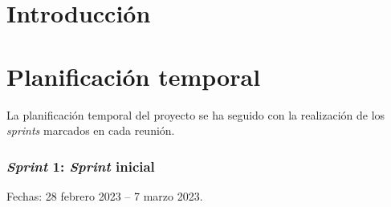 
\section{Introducción}

\section{Planificación temporal}
La planificación temporal del proyecto se ha seguido con la realización de los \textit{sprints} marcados en cada reunión.

\subsubsection{\textit{Sprint} 1: \textit{Sprint} inicial}
Fechas: 28 febrero 2023 -- 7 marzo 2023.
